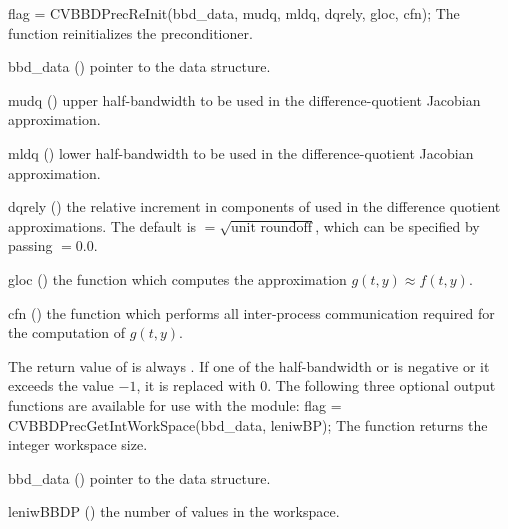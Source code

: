 {
  flag = CVBBDPrecReInit(bbd\_data, mudq, mldq, dqrely, gloc, cfn);
}
{
  The function  reinitializes the {\cvbbdpre} preconditioner.
}
{
  \begin{args}
  \item[bbd\_data] ()
    pointer to the {\cvbbdpre} data structure.
  \item[mudq] ()
    upper half-bandwidth to be used in the difference-quotient Jacobian approximation.
  \item[mldq] ()
    lower half-bandwidth to be used in the difference-quotient Jacobian approximation.
  \item[dqrely] ()
    the relative increment in components of  used in the difference quotient
    approximations.  The default is  $= \sqrt{\text{unit roundoff}}$, which
    can be specified by passing  $= 0.0$.
  \item[gloc] ()
    the {\C} function which computes the approximation $g(t,y) \approx f(t,y)$. 
  \item[cfn] ()
    the {\C} function which performs all inter-process communication required for
    the computation of $g(t,y)$.
  \end{args}
}
{
  The return value of  is always .
}
{
  If one of the half-bandwidth  or  is negative or it
  exceeds the value $-1$, it is replaced with 0.
}
The following three optional output functions are available for use with
the {\cvbbdpre} module:
{
  flag = CVBBDPrecGetIntWorkSpace(bbd\_data, leniwBP);
}
{
  The function  returns the
  {\cvbbdpre} integer workspace size.
}
{
  \begin{args}[leniwBBDP]
  \item[bbd\_data] ()
    pointer to the {\cvbbdpre} data structure.
  \item[leniwBBDP] ()
    the number of  values in the {\cvbbdpre} workspace.
  \end{args}
}
